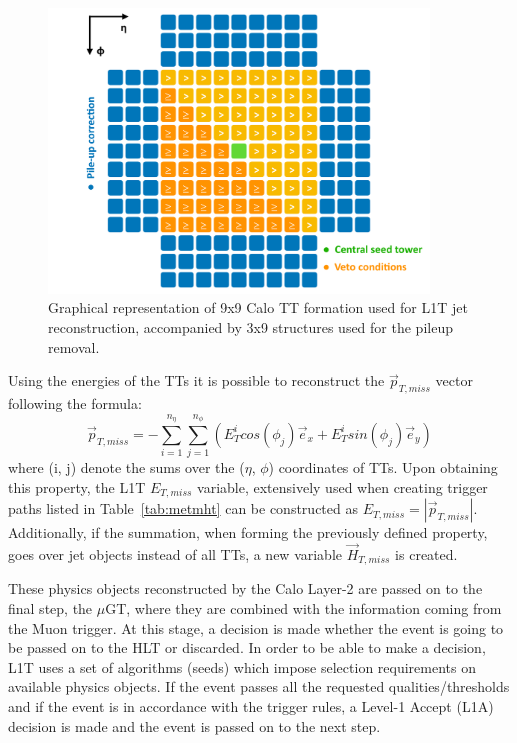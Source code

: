 \begin{figure}[htbp]
  \centering
    \includegraphics[width=0.9\textwidth]{CMS_experiment/jet_chunky.pdf}
  \caption{Graphical representation of 9x9 Calo TT formation used for L1T jet reconstruction, accompanied by 3x9 structures used for the pileup removal.}
  \label{fig:l1_jet_chunky}
\end{figure} 

Using the energies of the TTs it is possible to reconstruct the $\vec{p}_{T,miss}$ vector following the formula:
\begin{equation}
 \vec{p}_{T,miss} = -\sum_{i=1}^{n_{\eta}}\sum_{j=1}^{n_{\phi}}(E^{i}_{T}cos(\phi_j)\vec{e}_x + E^{i}_{T}sin(\phi_j)\vec{e}_y)
\end{equation}
 where (i, j) denote the sums over the ($\eta$, $\phi$) coordinates of TTs. Upon obtaining this property, the L1T $E_{T, miss}$ variable, extensively used when creating trigger paths listed in Table~\ref{tab:metmht} can be constructed as $E_{T, miss} = |\vec{p}_{T,miss}|$. Additionally, if the summation, when forming the previously defined property, goes over jet objects instead of all TTs, a new variable $\vec{H}_{T,miss}$ is created. 
 
\hspace{10pt} These physics objects reconstructed by the Calo Layer-2 are passed on to the final step, the $\mu$GT, where they are combined with the information coming from the Muon trigger. At this stage, a decision is made whether the event is going to be passed on to the HLT or discarded. In order to be able to make a decision, L1T uses a set of algorithms (seeds) which impose selection requirements on available physics objects. If the event passes all the requested qualities/thresholds and if the event is in accordance with the trigger rules, a Level-1 Accept (L1A) decision is made and the event is passed on to the next step.

